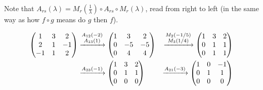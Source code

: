 \documentclass[10pt, a4paper]{article}
\begin{document}
Note that $A_{rs}(\lambda) = M_r\left(\frac{1}{\lambda}\right) \circ A_{rs} \circ M_r(\lambda)$,
read from right to left (in the same way as how $f \circ g$ means do $g$ then $f$).
\begin{example}
    \begin{align*}
    \begin{pmatrix}
        1 & 3 & 2 \\
        2 & 1 & -1 \\
        -1 & 1 & 2
    \end{pmatrix}
    &\xrightarrow{
    \begin{subarray}{c}
        A_{12}(-2) \\ A_{13}(1)
    \end{subarray}
    }
    \begin{pmatrix}
        1 & 3 & 2 \\
        0 & -5 & -5 \\
        0 & 4 & 4
    \end{pmatrix}
    &\xrightarrow{
    \begin{subarray}{c}
        M_2(-1 / 5) \\ M_3(1 / 4)
    \end{subarray}
    }
    \begin{pmatrix}
        1 & 3 & 2 \\
        0 & 1 & 1 \\
        0 & 1 & 1
    \end{pmatrix} 
    \\
    &\xrightarrow{
    \begin{subarray}{c}
        A_{23}(-1)
    \end{subarray}
    }
    \begin{pmatrix}
        1 & 3 & 2 \\
        0 & 1 & 1 \\
        0 & 0 & 0
    \end{pmatrix}
    &\xrightarrow{
    \begin{subarray}{c}
        A_{21}(-3)
    \end{subarray}
    }
    \begin{pmatrix}
        1 & 0 & -1 \\
        0 & 1 & 1 \\
        0 & 0 & 0
    \end{pmatrix}
    \end{align*}
\end{example}
\end{document}
